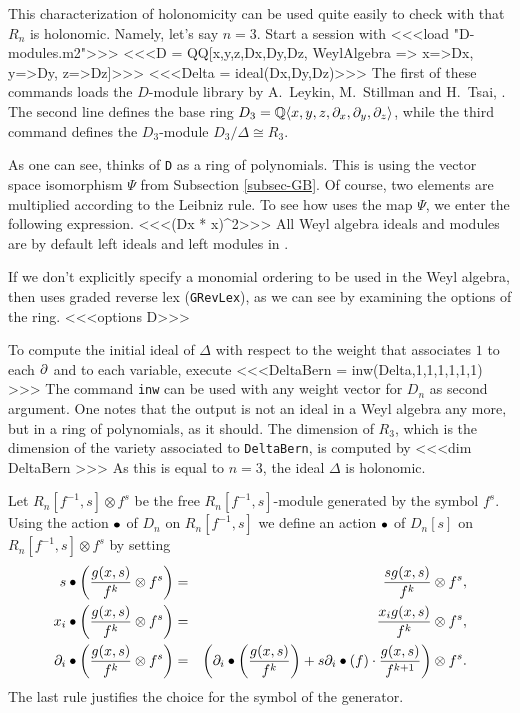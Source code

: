 This characterization of holonomicity can be used quite easily to
check with \Mtwo that $R_n$ is holonomic. Namely, let's say $n=3$. 
Start a \Mtwo session with
<<<load "D-modules.m2">>>
<<<D = QQ[x,y,z,Dx,Dy,Dz, WeylAlgebra => {x=>Dx, y=>Dy, z=>Dz}]>>>
<<<Delta = ideal(Dx,Dy,Dz)>>>
The first of these commands loads the $D$-module library 
by A.\ Leykin, M.\ Stillman  and H.\ Tsai, \cite{DM:M2D}. 
The second line defines the
base ring $D_3={\mathbb Q}\langle x,y,z,\partial_x,\partial_y,\partial_z\rangle$, 
while the third command defines the $D_3$-module $D_3/\Delta\cong
R_3$.

As one can see, \Mtwo thinks of {\tt D} as a ring of polynomials. This is
using the vector space isomorphism $\Psi$ from Subsection
\ref{subsec-GB}. Of course, two elements are multiplied according to
the Leibniz rule. 
To see how \Mtwo uses the map $\Psi$, we enter the following expression.
<<<(Dx * x)^2>>>
All Weyl algebra ideals and modules 
are by default left
ideals and left modules in \Mtwo. 

If we don't explicitly specify a monomial ordering to be used in the Weyl
algebra, then \Mtwo uses graded reverse lex ({\tt GRevLex}), as we can see by
examining the options of the ring.
<<<options D>>>

To compute the initial ideal of $\Delta$ with respect to the weight
that associates $1$ to each $\partial$ and to each variable, execute
<<<DeltaBern = inw(Delta,{1,1,1,1,1,1}) >>>
The command {\tt inw} can be used with any weight vector for $D_n$ as
second argument. 
One notes that the output is not an ideal in a Weyl algebra any more,
but in a ring of polynomials, as it should.
The dimension of $R_3$, which is the dimension of the variety
associated to {\tt DeltaBern}, is computed by
<<<dim DeltaBern >>>
As this is equal to $n=3$, the ideal $\Delta$ is holonomic.

\bigskip

Let $R_n[f^{-1},s]\otimes f^s$ be the free $R_n[f^{-1},s]$-module
generated by the symbol $f^s$.  
Using the action $\bullet$ of $D_n$ on $R_n[f^{-1},s]$ we define an
action $\bullet$ 
of $D_n[s]$ on 
$R_n[f^{-1},s]\otimes f^s$ by setting
\begin{eqnarray*}
s\bullet \left(\frac{g(x,s)}{f^k}\otimes f^s\right)&=& 
\frac{sg(x,s)}{f^k}\otimes f^s,\\
x_i\bullet\left(\frac{g(x,s)}{f^k}\otimes f^s\right)&=&
 \frac{x_ig(x,s)}{f^k}\otimes f^s,\\
\partial_i\bullet\left(\frac{g(x,s)}{f^k}\otimes f^s\right)&=&
 \left(\partial_i\bullet\left(\frac{g(x,s)}{f^k}\right)+s\partial_i\bullet(f)\cdot
 \frac{g(x,s)}{f^{k+1}}\right)\otimes f^s.
\end{eqnarray*}
The last rule justifies the choice for the symbol of the generator.

